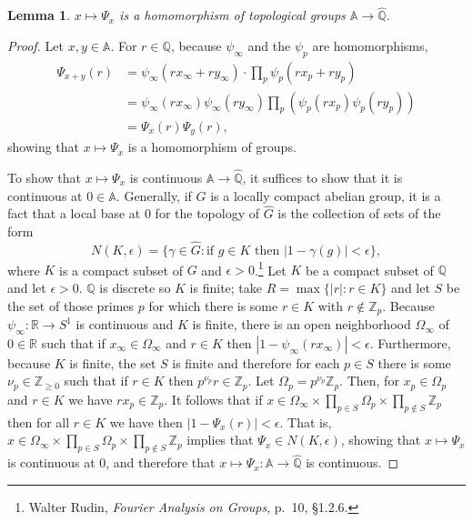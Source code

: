 \documentclass{article}
\newtheorem{lemma}[theorem]{Lemma}
\theoremstyle{definition}
\begin{document}
\begin{lemma}
$x \mapsto \Psi_x$ is a homomorphism of topological groups $\mathbb{A} \to \widehat{\mathbb{Q}}$.
\end{lemma}
\begin{proof}
Let $x,y \in \mathbb{A}$. For $r \in \mathbb{Q}$, because $\psi_\infty$ and the $\psi_p$ are homomorphisms,
\begin{align*}
\Psi_{x+y}(r) &=  \psi_\infty(rx_\infty+ry_\infty) \cdot \prod_p \psi_p(rx_p+ry_p)\\
&=\psi_\infty(rx_\infty) \psi_\infty(ry_\infty) \prod_p (\psi_p(rx_p) \psi_p(ry_p))\\
&=\Psi_x(r) \Psi_y(r),
\end{align*}
showing that $x \mapsto \Psi_x$ is a homomorphism of groups.

To show  that $x \mapsto \Psi_x$ is continuous $\mathbb{A} \to \widehat{\mathbb{Q}}$, it suffices to show that
it is continuous at $0 \in \mathbb{A}$. Generally, if $G$ is a locally compact abelian group, it is a fact that a local base at $0$ for
the topology of $\widehat{G}$ is the collection of sets of the form
\[
N(K,\epsilon) = \{\gamma \in \widehat{G}: \textrm{if $g \in K$ then $|1-\gamma(g)|<\epsilon$}\},
\]
where $K$ is a compact subset of $G$ and $\epsilon>0$.\footnote{Walter Rudin, {\em Fourier Analysis on Groups}, p.~10, \S 1.2.6.}
Let $K$ be a compact subset of $\mathbb{Q}$ and let $\epsilon>0$. $\mathbb{Q}$ is discrete so $K$ is finite; take $R=\max\{|r|:r \in K\}$ and let
$S$ be the set of those primes $p$ for which there is some $r \in K$ with $r \not \in \mathbb{Z}_p$.
Because $\psi_\infty:\mathbb{R} \to S^1$ is continuous and $K$ is finite, there is an open neighborhood $\Omega_\infty$ of $0 \in \mathbb{R}$ such that if
$x_\infty \in \Omega_\infty$
and $r \in K$ then $|1-\psi_\infty(rx_\infty)|<\epsilon$. Furthermore,
because $K$ is finite, the set $S$ is finite
and therefore for each $p \in S$ there is some $\nu_p \in \mathbb{Z}_{\geq 0}$ such that if $r \in K$ then $p^{\nu_p} r \in \mathbb{Z}_p$.
Let $\Omega_p = p^{\nu_p} \mathbb{Z}_p$. Then, for $x_p \in \Omega_p$ and $r \in K$ we have $rx_p \in \mathbb{Z}_p$. 
It follows that if 
$x \in \Omega_\infty \times \prod_{p \in S} \Omega_p \times \prod_{p \not \in S} \mathbb{Z}_p$ then
for all $r \in K$ we have 
then $|1-\Psi_x(r)|<\epsilon$. That is,
$x \in \Omega_\infty \times \prod_{p \in S} \Omega_p \times \prod_{p \not \in S} \mathbb{Z}_p$ implies that $\Psi_x \in N(K,\epsilon)$,
showing that $x \mapsto \Psi_x$ is continuous at $0$, and therefore that $x \mapsto \Psi_x:\mathbb{A} \to \widehat{\mathbb{Q}}$ is continuous.
\end{proof}
\end{document}

